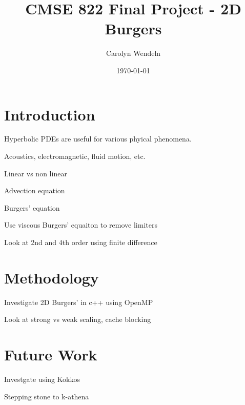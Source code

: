 \documentclass{article}
\title{CMSE 822 Final Project - 2D Burgers}
\author{Carolyn Wendeln}
\date{\today}
\begin{document}
\maketitle

\section{Introduction}

Hyperbolic PDEs are useful for various phyical phenomena.

Acoustics, electromagnetic, fluid motion, etc.

Linear vs non linear 

Advection equation

Burgers' equation

Use viscous Burgers' equaiton to remove limiters

Look at 2nd and 4th order using finite difference

\section{Methodology}

Investigate 2D Burgers' in c++ using OpenMP

Look at strong vs weak scaling, cache blocking 


\section{Future Work}

Investgate using Kokkos 

Stepping stone to k-athena
\end{document}

